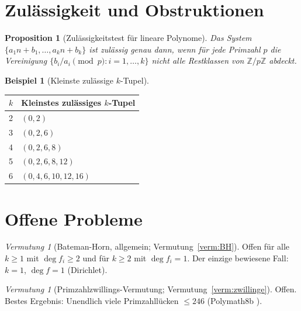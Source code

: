 \documentclass[12pt,a4paper]{amsart}
\newtheorem{proposition}[theorem]{Proposition}
\theoremstyle{definition}
\newtheorem{example}[theorem]{Beispiel}
\theoremstyle{remark}
\newtheorem{vermutung}[theorem]{Vermutung}
\newcommand{\Z}{\mathbb{Z}}
\begin{document}
\section{Zulässigkeit und Obstruktionen}\label{sec:zulässigkeit}

\begin{proposition}[Zulässigkeitstest für lineare Polynome]
  Das System $\{a_1 n + b_1, \ldots, a_k n + b_k\}$ ist zulässig genau dann, wenn
  für jede Primzahl $p$ die Vereinigung $\{b_i/a_i \pmod{p} : i=1,\ldots,k\}$ nicht
  alle Restklassen von $\Z/p\Z$ abdeckt.
\end{proposition}

\begin{example}[Kleinste zulässige $k$-Tupel]
  \begin{center}
    \begin{tabular}{ll}
      \toprule
      $k$ & Kleinstes zulässiges $k$-Tupel \\
      \midrule
      2 & $(0, 2)$ \\
      3 & $(0, 2, 6)$ \\
      4 & $(0, 2, 6, 8)$ \\
      5 & $(0, 2, 6, 8, 12)$ \\
      6 & $(0, 4, 6, 10, 12, 16)$ \\
      \bottomrule
    \end{tabular}
  \end{center}
\end{example}

\section{Offene Probleme}\label{sec:offene_probleme}

\begin{vermutung}[Bateman-Horn, allgemein; Vermutung~\ref{verm:BH}]
  Offen für alle $k \geq 1$ mit $\deg f_i \geq 2$ und für $k \geq 2$ mit $\deg f_i = 1$.
  Der einzige bewiesene Fall: $k=1$, $\deg f = 1$ (Dirichlet).
\end{vermutung}

\begin{vermutung}[Primzahlzwillings-Vermutung; Vermutung~\ref{verm:zwillinge}]
  Offen. Bestes Ergebnis: Unendlich viele Primzahllücken $\leq 246$
  (Polymath8b \cite{Polymath2014}).
\end{vermutung}
\end{document}
